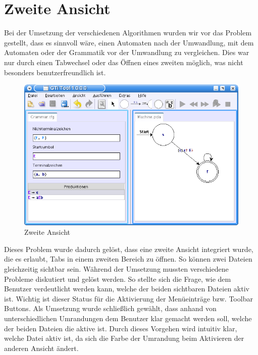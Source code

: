 \section{Zweite Ansicht}\label{SecondView}

Bei der Umsetzung der verschiedenen Algorithmen wurden wir vor das Problem
gestellt, dass es sinnvoll wäre, einen Automaten nach der Umwandlung, mit dem
Automaten oder der Grammatik vor der Umwandlung zu vergleichen. Dies war nur
durch einen Tabwechsel oder das Öffnen eines zweiten \gtitools möglich, was
nicht besonders benutzerfreundlich ist.\vspace{10pt}

\begin{figure}[h!]
\begin{center}
\includegraphics[width=12cm]{../images/second_view.png}
\caption{Zweite Ansicht}
\end{center}
\end{figure}
\vspace{10pt}

Dieses Problem wurde dadurch gelöst, dass eine zweite Ansicht integriert wurde,
die es erlaubt, Tabs in einem zweiten Bereich zu öffnen. So können zwei Dateien
gleichzeitig sichtbar sein. Während der Umsetzung mussten verschiedene Probleme
diskutiert und gelöst werden. So stellte sich die Frage, wie dem Benutzer
verdeutlicht werden kann, welche der beiden sichtbaren Dateien aktiv ist.
Wichtig ist dieser Status für die Aktivierung der Menüeinträge bzw. Toolbar
Buttons. Als Umsetzung wurde schließlich gewählt, dass anhand von
unterschiedlichen Umrandungen dem Benutzer klar gemacht werden soll, welche der
beiden Dateien die aktive ist. Durch dieses Vorgehen wird intuitiv klar, welche
Datei aktiv ist, da sich die Farbe der Umrandung beim Aktivieren der anderen
Ansicht ändert.\vspace{10pt}

